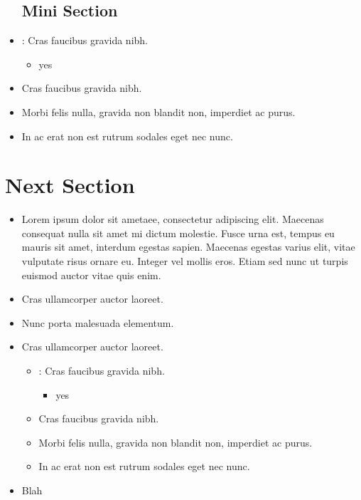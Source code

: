 \documentclass[12pt,a4paper]{report}
\begin{document}
\begin{itemize}
    \subsection{Mini Section}
        \item {}: Cras faucibus gravida nibh.
            \begin{itemize}
                \item yes
            \end{itemize}
        \item  Cras faucibus gravida nibh.
        \item  Morbi felis nulla, gravida non blandit non, imperdiet ac purus.
        \item  In ac erat non est rutrum sodales eget nec nunc.
\end{itemize}

\section{Next Section}
\begin{itemize}
    \item Lorem ipsum dolor sit {\color{o-Sun}ametaee}, consectetur adipiscing elit. Maecenas consequat nulla sit amet mi dictum molestie. Fusce urna est, tempus eu mauris sit amet, interdum egestas sapien. Maecenas egestas varius elit, vitae vulputate risus ornare eu. Integer vel mollis eros. Etiam sed nunc ut turpis euismod auctor vitae quis enim.
        \item Cras ullamcorper auctor laoreet. 
        \item Nunc porta malesuada elementum. 
        \item Cras ullamcorper auctor laoreet.
    \begin{itemize}
    \subsection{Mini Section}
        \item {}: Cras faucibus gravida nibh.
            \begin{itemize}
                \item yes
            \end{itemize}
        \item  Cras faucibus gravida nibh.
        \item  Morbi felis nulla, gravida non blandit non, imperdiet ac purus.
        \item  In ac erat non est rutrum sodales eget nec nunc.
    \end{itemize}
    \item Blah
\end{itemize}
\end{document}
